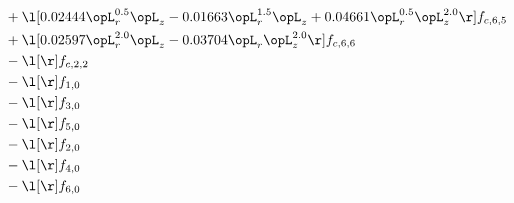 \begin{alignat}{2}
& + \l[  0.02444 \opL_r^{0.5} \opL_z   -0.01663 \opL_r^{1.5} \opL_z +  0.04661 \opL_r^{0.5} \opL_z^{2.0}  \r] f_{c,6,5} \nonumber \\ 
& + \l[  0.02597 \opL_r^{2.0} \opL_z   -0.03704 \opL_r \opL_z^{2.0}  \r] f_{c,6,6} \nonumber \\ 
& - \l[  \r] f_{c,2,2} \nonumber \\ 
& - \l[  \r] f_{1,0} \nonumber \\ 
& - \l[  \r] f_{3,0} \nonumber \\ 
& - \l[  \r] f_{5,0} \nonumber \\ 
& - \l[  \r] f_{2,0} \nonumber \\ 
& - \l[  \r] f_{4,0} \nonumber \\ 
& - \l[  \r] f_{6,0} \nonumber \\ 
\end{alignat} 



